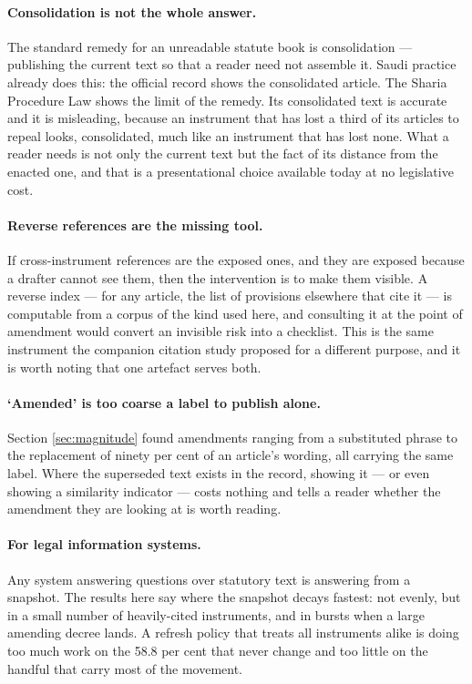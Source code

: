 \documentclass[11pt]{article}
\begin{document}
\paragraph{Consolidation is not the whole answer.} The standard remedy for an
unreadable statute book is consolidation --- publishing the current text so
that a reader need not assemble it. Saudi practice already does this: the
official record shows the consolidated article. The Sharia Procedure Law shows
the limit of the remedy. Its consolidated text is accurate and it is
misleading, because an instrument that has lost a third of its articles to
repeal looks, consolidated, much like an instrument that has lost none. What a
reader needs is not only the current text but the fact of its distance from
the enacted one, and that is a presentational choice available today at no
legislative cost.

\paragraph{Reverse references are the missing tool.} If cross-instrument
references are the exposed ones, and they are exposed because a drafter cannot
see them, then the intervention is to make them visible. A reverse index ---
for any article, the list of provisions elsewhere that cite it --- is
computable from a corpus of the kind used here, and consulting it at the point
of amendment would convert an invisible risk into a checklist. This is the
same instrument the companion citation study proposed for a different purpose,
and it is worth noting that one artefact serves both.

\paragraph{`Amended' is too coarse a label to publish alone.} Section
\ref{sec:magnitude} found amendments ranging from a substituted phrase to the
replacement of ninety per cent of an article's wording, all carrying the same
label. Where the superseded text exists in the record, showing it --- or even
showing a similarity indicator --- costs nothing and tells a reader whether
the amendment they are looking at is worth reading.

\paragraph{For legal information systems.} Any system answering questions over
statutory text is answering from a snapshot. The results here say where the
snapshot decays fastest: not evenly, but in a small number of heavily-cited
instruments, and in bursts when a large amending decree lands. A refresh policy
that treats all instruments alike is doing too much work on the 58.8 per cent
that never change and too little on the handful that carry most of the
movement.
\end{document}
